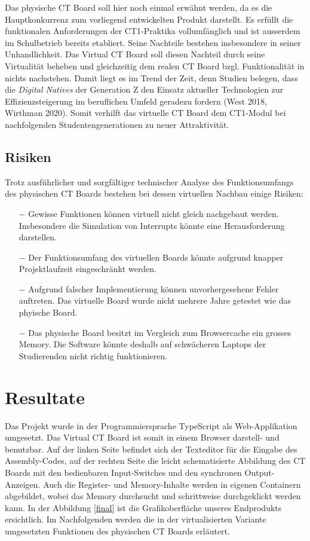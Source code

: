 \documentclass[10pt]{article}
\begin{document}
Das physische CT Board soll hier noch einmal erwähnt werden, da es die Hauptkonkurrenz zum vorliegend entwickelten Produkt darstellt. Es erfüllt die funktionalen Anforderungen der CT1-Praktika vollumfänglich und ist ausserdem im Schulbetrieb bereits etabliert. Seine Nachteile bestehen insbesondere in seiner Unhandlichkeit. Das \glqq Virtual CT Board\grqq{} soll diesen Nachteil durch seine Virtualität beheben und gleichzeitig dem realen CT Board bzgl. Funktionalität in nichts nachstehen. Damit liegt es im Trend der Zeit, denn Studien belegen, dass die \emph{Digital Natives} der Generation Z den Einsatz aktueller Technologien zur Effizienzsteigerung im beruflichen Umfeld geradezu fordern (West 2018, Wirthman 2020). Somit verhilft das virtuelle CT Board dem CT1-Modul bei nachfolgenden Studentengenerationen zu neuer Attraktivität.


\subsection{Risiken}
Trotz ausführlicher und sorgfältiger technischer Analyse des Funktionsumfangs des physischen CT Boards bestehen bei dessen virtuellen Nachbau einige Risiken:
\begin{itemize}
\item[$-$] Gewisse Funktionen können virtuell nicht gleich nachgebaut werden. Insbesondere die Simulation von Interrupts könnte eine Herausforderung darstellen.
\item[$-$] Der Funktionsumfang des virtuellen Boards könnte aufgrund knapper Projektlaufzeit eingeschränkt werden. 
\item[$-$] Aufgrund falscher Implementierung können unvorhergesehene Fehler auftreten. Das virtuelle Board wurde nicht mehrere Jahre getestet wie das phyische Board.
\item[$-$] Das physische Board besitzt im Vergleich zum Browsercache ein grosses Memory. Die Software könnte deshalb auf schwächeren Laptops der Studierenden nicht richtig funktionieren. 
\end{itemize}

\section{Resultate}

Das Projekt wurde in der Programmiersprache TypeScript als Web-Applikation umgesetzt. Das \glqq Virtual CT Board\grqq{} ist somit in einem Browser darstell- und benutzbar. Auf der linken Seite befindet sich der Texteditor für die Eingabe des Assembly-Codes, auf der rechten Seite die leicht schematisierte Abbildung des CT Boards mit den bedienbaren Input-Switches und den synchronen Output-Anzeigen. Auch die Register- und Memory-Inhalte werden in eigenen Containern abgebildet, wobei das Memory durchsucht und schrittweise durchgeklickt werden kann. In der Abbildung \ref{final} ist die Grafikoberfläche unseres Endprodukts ersichtlich. Im Nachfolgenden werden die in der virtualisierten Variante umgesetzten Funktionen des physischen CT Boards erläutert.
\end{document}
